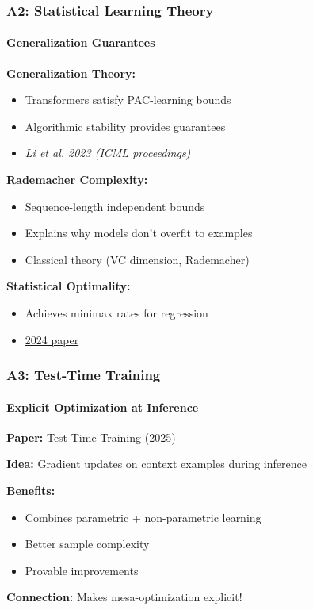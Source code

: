 \documentclass[10pt,aspectratio=169]{beamer}
\begin{document}
\begin{frame}
\frametitle{A2: Statistical Learning Theory}
\framesubtitle{Generalization Guarantees}

\textbf{Generalization Theory:}
\begin{itemize}
    \item Transformers satisfy PAC-learning bounds
    \item Algorithmic stability provides guarantees
    \item \textit{Li et al. 2023 (ICML proceedings)}
\end{itemize}

\vspace{0.5cm}
\textbf{Rademacher Complexity:}
\begin{itemize}
    \item Sequence-length independent bounds
    \item Explains why models don't overfit to examples
    \item Classical theory (VC dimension, Rademacher)
\end{itemize}

\vspace{0.5cm}
\textbf{Statistical Optimality:}
\begin{itemize}
    \item Achieves minimax rates for regression
    \item \href{papers/2408.12186_minimax_optimal.pdf}{\color{blue}2024 paper}
\end{itemize}
\end{frame}

\begin{frame}
\frametitle{A3: Test-Time Training}
\framesubtitle{Explicit Optimization at Inference}

\begin{center}
\Large
\textbf{Paper:} \href{papers/2503.11842_test_time_training.pdf}{\color{blue}Test-Time Training (2025)}
\end{center}

\vspace{0.5cm}

\textbf{Idea:} Gradient updates on context examples during inference

\vspace{0.5cm}
\textbf{Benefits:}
\begin{itemize}
    \item Combines parametric + non-parametric learning
    \item Better sample complexity
    \item Provable improvements
\end{itemize}

\vspace{0.5cm}
\textbf{Connection:} Makes mesa-optimization explicit!
\end{frame}
\end{document}
